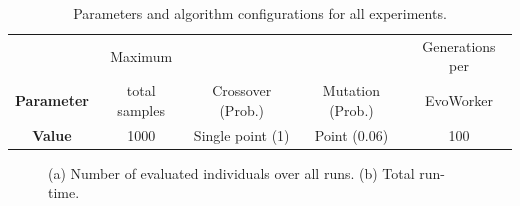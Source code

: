 \begin{table}[t]
\caption{Parameters and algorithm configurations for all experiments.}
\centering
\begin{tabular}{|c||c|c|c|c|}
   \hline
                       & Maximum          &                    &                  & Generations per \\
   \textbf{Parameter}  & total samples    & Crossover (Prob.)  & Mutation (Prob.) & EvoWorker        \\

	\hline
   \textbf{Value}     &	1000 &	Single point (1) &	Point  (0.06)   & 100    \\
   \hline

\end{tabular}
\label{tab:exp2}
\end{table}


%
%

\begin{figure}[t]
    \centering
    \caption{
    (a) Number of evaluated individuals over all runs.
    (b) Total run-time.}
    \label{fig:effort}
\end{figure}

